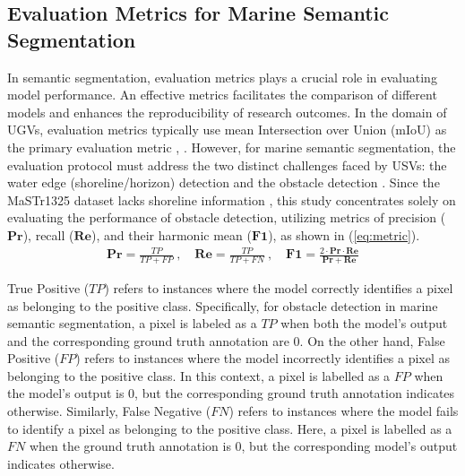 \subsection{Evaluation Metrics for Marine Semantic Segmentation}
In semantic segmentation, evaluation metrics plays a crucial role in evaluating model performance. An effective 
metrics facilitates the comparison of different models and enhances the reproducibility of research outcomes. In 
the domain of UGVs, evaluation metrics typically use mean Intersection over Union (mIoU) as the primary evaluation 
metric \cite{CamVid}, \cite{Cityscapes}. However, for marine semantic segmentation, the evaluation protocol must 
address the two distinct challenges faced by USVs: the water edge (shoreline/horizon) detection and the obstacle 
detection \cite{usvbenchmark}. Since the MaSTr1325 dataset lacks shoreline information \cite{MaSTr1325}, this study 
concentrates solely on evaluating the performance of obstacle detection, utilizing metrics of precision 
($\mathbf{Pr}$), recall ($\mathbf{Re}$), and their harmonic mean ($\mathbf{F1}$), as shown in (\ref{eq:metric}).\\
\begin{align}
    \mathbf{Pr} = \frac{TP}{TP+FP} \ , \quad \mathbf{Re} = \frac{TP}{TP+FN} \ , \quad \mathbf{F1} = \frac{2\cdot\mathbf{Pr}\cdot\mathbf{Re}}{\mathbf{Pr}+\mathbf{Re}}
    \label{eq:metric}
\end{align}

True Positive ($TP$) refers to instances where the model correctly identifies a pixel as belonging to the positive 
class. Specifically, for obstacle detection in marine semantic segmentation, a pixel is labeled as a $TP$ when both 
the model's output and the corresponding ground truth annotation are 0. On the other hand, False Positive ($FP$) 
refers to instances where the model incorrectly identifies a pixel as belonging to the positive class. In this 
context, a pixel is labelled as a $FP$ when the model's output is 0, but the corresponding ground truth annotation 
indicates otherwise. Similarly, False Negative ($FN$) refers to instances where the model fails to identify a pixel 
as belonging to the positive class. Here, a pixel is labelled as a $FN$ when the ground truth annotation is 0, but 
the corresponding model's output indicates otherwise.
